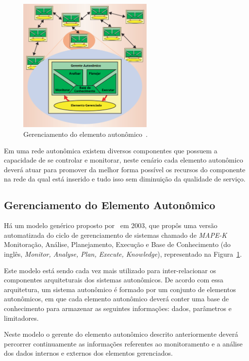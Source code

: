 \documentclass[11pt,twoside]{article}
\begin{document}
\begin{figure}
    \centering
    \includegraphics[width=0.6\textwidth]{Picture3.png}
    \caption{Gerenciamento do elemento autonômico~\cite{KEPHART}.}
    \label{Sec:Intro:Fig3}
\end{figure}

Em uma rede autonômica existem diversos componentes que possuem a capacidade de se controlar e monitorar, neste cenário cada elemento autonômico deverá atuar para promover da melhor forma possível os recursos do componente na rede da qual está inserido e tudo isso sem diminuição da qualidade de serviço.

\subsection{Gerenciamento do Elemento Autonômico}
Há um modelo genérico proposto por~\cite{KEPHART} em 2003, que propôs uma versão automatizada do ciclo de gerenciamento de sistemas chamado de \textit{MAPE-K} Monitoração, Análise, Planejamento, Execução e Base de Conhecimento (do inglês, \textit{Monitor, Analyse, Plan, Execute, Knowledge}), representado na Figura~\ref{Sec:Intro:Fig3}.

Este modelo está sendo cada vez mais utilizado para inter-relacionar os componentes arquiteturais dos sistemas autonômicos. De acordo com essa arquitetura, um sistema autonômico é formado por um conjunto de elementos autonômicos, em que cada elemento autonômico deverá conter uma base de conhecimento para armazenar as seguintes informações: dados, parâmetros e limitadores. 

Neste modelo o gerente do elemento autonômico descrito anteriormente deverá percorrer continuamente as informações referentes ao monitoramento e a análise dos dados internos e externos dos elementos gerenciados.
\end{document}
